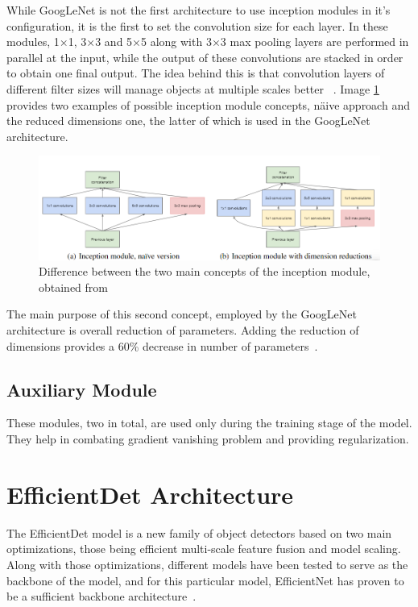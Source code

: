 While GoogLeNet is not the first architecture to use inception modules in it's configuration, it is the first to set the convolution size for each layer. In these modules, 1$\times$1, 3$\times$3 and 5$\times$5 along with 3$\times$3 max pooling layers are performed in parallel at the input, while the output of these convolutions are stacked in order to obtain one final output. The idea behind this is that convolution layers of different filter sizes will manage objects at multiple scales better ~\cite{link17}. Image \ref{fig:fig43} provides two examples of possible inception module concepts, n\"aive approach and the reduced dimensions one, the latter of which is used in the GoogLeNet architecture.

\begin{figure}[H]
    \centering
    \includegraphics[width=1\linewidth]{figures/Figure57.png}
    \caption{Difference between the two main concepts of the inception module, obtained from ~\cite{carte13}}
    \label{fig:fig43}
\end{figure}

The main purpose of this second concept, employed by the GoogLeNet architecture is overall reduction of parameters. Adding the reduction of dimensions provides a 60\% decrease in number of parameters~\cite{carte14}.

\subsection{Auxiliary Module}

These modules, two in total, are used only during the training stage of the model. They help in combating gradient vanishing problem and providing regularization.

\section{EfficientDet Architecture}

The EfficientDet model is a new family of object detectors based on two main optimizations, those being efficient multi-scale feature fusion and model scaling. Along with those optimizations, different models have been tested to serve as the backbone of the model, and for this particular model, EfficientNet has proven to be a sufficient backbone architecture~\cite{carte8}.

